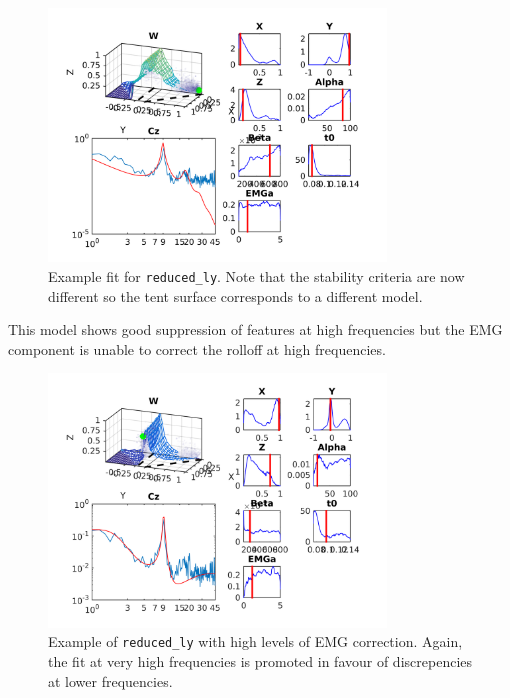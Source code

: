 \documentclass[10pt,a4paper]{article}
\begin{document}
\begin{figure}[h!]
\begin{center}
\includegraphics[width=0.8\textwidth]{example_reduced_ly}
\caption{Example fit for \texttt{reduced\_ly}. Note that the stability criteria are now different so the tent surface corresponds to a different model.}
\label{fig:full}
\end{center}
\end{figure}

This model shows good suppression of features at high frequencies but the EMG component is unable to correct the rolloff at high frequencies.


\begin{figure}[h!]
\begin{center}
\includegraphics[width=0.8\textwidth]{example_reduced_ly_emg_high}
\caption{Example of \texttt{reduced\_ly} with high levels of EMG correction. Again, the fit at very high frequencies is promoted in favour of discrepencies at lower frequencies.}
\label{fig:full}
\end{center}
\end{figure}
\end{document}

